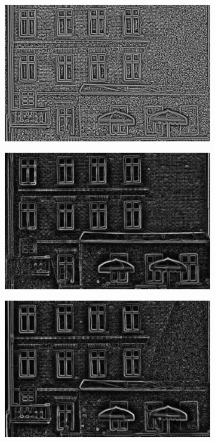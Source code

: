 \documentclass[thesis.tex]{subfiles}
\begin{document}
\begin{figure}[tb]
\begin{subfigure}[t]{0.49\textwidth}
        \includegraphics[width=\textwidth]{img/pixelNormalizationExample6.png}
        \caption{}
        \label{fig:pixelNormalizationExample6}
    \end{subfigure}
    \begin{subfigure}[t]{0.49\textwidth}
        \includegraphics[width=\textwidth]{img/pixelNormalizationExample7.png}
        \caption{}
        \label{fig:pixelNormalizationExample7}
    \end{subfigure}
    \begin{subfigure}[t]{0.49\textwidth}
        \includegraphics[width=\textwidth]{img/pixelNormalizationExample8.png}

\end{subfigure}
\end{figure}
\end{document}
